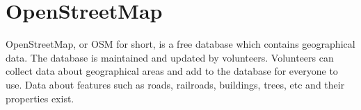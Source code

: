 \section{OpenStreetMap}
    OpenStreetMap, or OSM for short, is a free database which contains geographical data. The database is maintained and updated by volunteers. Volunteers can collect data about geographical areas and add to the database for everyone to use. Data about features such as roads, railroads, buildings, trees, etc and their properties exist.